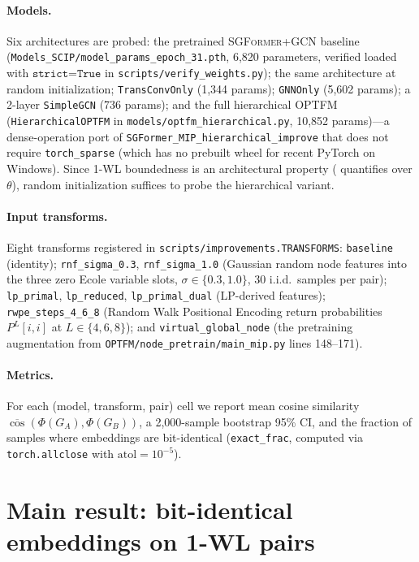 \documentclass[11pt]{article}
\theoremstyle{plain}
\theoremstyle{definition}
\theoremstyle{remark}
\newcommand{\optfm}{\textsc{OPTFM}}
\newcommand{\sgformer}{\textsc{SGFormer}}
\begin{document}
\paragraph{Models.}
Six architectures are probed: the pretrained \sgformer{}+GCN baseline
(\texttt{Models\_SCIP/model\_params\_epoch\_31.pth}, 6{,}820 parameters,
verified loaded with $\texttt{strict=True}$ in
\texttt{scripts/verify\_weights.py}); the same architecture at random
initialization; \texttt{TransConvOnly} (1{,}344 params); \texttt{GNNOnly}
(5{,}602 params); a 2-layer \texttt{SimpleGCN} (736 params); and the full
hierarchical \optfm{} (\texttt{HierarchicalOPTFM} in
\texttt{models/optfm\_hierarchical.py}, 10{,}852 params)---a dense-operation
port of \texttt{SGFormer\_MIP\_hierarchical\_improve} that does not require
\texttt{torch\_sparse} (which has no prebuilt wheel for recent PyTorch on
Windows). Since 1-WL boundedness is an architectural property
( quantifies over $\theta$), random initialization suffices to
probe the hierarchical variant.

\paragraph{Input transforms.}
Eight transforms registered in \texttt{scripts/improvements.TRANSFORMS}:
\texttt{baseline} (identity); \texttt{rnf\_sigma\_0.3}, \texttt{rnf\_sigma\_1.0}
(Gaussian random node features into the three zero Ecole variable slots,
$\sigma\!\in\!\{0.3, 1.0\}$, 30 i.i.d.\ samples per pair);
\texttt{lp\_primal}, \texttt{lp\_reduced}, \texttt{lp\_primal\_dual} (LP-derived
features); \texttt{rwpe\_steps\_4\_6\_8} (Random Walk Positional Encoding
return probabilities $P^L[i,i]$ at $L\!\in\!\{4,6,8\}$); and
\texttt{virtual\_global\_node} (the pretraining augmentation from
\texttt{OPTFM/node\_pretrain/main\_mip.py} lines 148--171).

\paragraph{Metrics.}
For each (model, transform, pair) cell we report mean cosine similarity
$\overline{\cos}(\Phi(G_A), \Phi(G_B))$, a 2{,}000-sample bootstrap 95\% CI,
and the fraction of samples where embeddings are bit-identical
(\texttt{exact\_frac}, computed via \texttt{torch.allclose} with
$\text{atol}\!=\!10^{-5}$).

\section{Main result: bit-identical embeddings on 1-WL pairs}
\label{sec:main}
\end{document}

